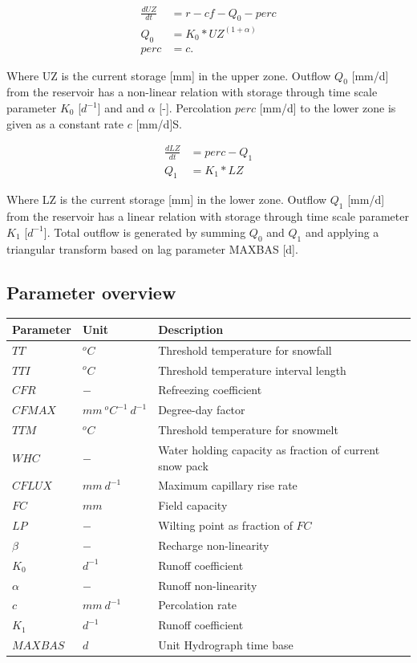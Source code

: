 \begin{align}
	\frac{dUZ}{dt} &= r-cf-Q_0-perc \\
	Q_0 &= K_0*UZ^{(1+\alpha)}\\
	perc &= c.
\end{align}

Where UZ is the current storage [mm] in the upper zone. Outflow $Q_0$ [mm/d] from the reservoir has a non-linear relation with storage through time scale parameter $K_0$ [$d^{-1}$] and and $\alpha$ [-]. Percolation $perc$ [mm/d] to the lower zone is given as a constant rate $c$ [mm/d]S.

\begin{align}
	\frac{dLZ}{dt} &= perc-Q_1 \\
	Q_1 &= K_1*LZ
\end{align}

Where LZ is the current storage [mm] in the lower zone. Outflow $Q_1$ [mm/d] from the reservoir has a linear relation with storage through time scale parameter $K_1$ [$d^{-1}$]. Total outflow is generated by summing $Q_0$ and $Q_1$ and applying a triangular transform based on lag parameter MAXBAS [d].

\subsection{Parameter overview}
\begin{table}[htbp]
  \centering
    \begin{tabular}{lll}
    \toprule
    Parameter & Unit  & Description \\
    \midrule
    $TT$  & $^oC$ & Threshold temperature for snowfall \\
    $TTI$ & $^oC$ & Threshold temperature interval length \\
    $CFR$ & $-$   & Refreezing coefficient \\
    $CFMAX$ & $mm~^oC^{-1}~d^{-1}$ & Degree-day factor \\
    $TTM$ & $^oC$ & Threshold temperature for snowmelt \\
    $WHC$ & $-$   & Water holding capacity as fraction of current snow pack \\
    $CFLUX$ & $mm~d^{-1}$ & Maximum capillary rise rate \\
    $FC$  & $mm$  & Field capacity \\
    $LP$  & $-$   & Wilting point as fraction of $FC$ \\
    $\beta$ & $-$   & Recharge non-linearity \\
    $K_0$ & $d^{-1}$ & Runoff coefficient \\
    $\alpha$ & $-$   & Runoff non-linearity \\
    $c$   & $mm~d^{-1}$ & Percolation rate \\
    $K_1$ & $d^{-1}$ & Runoff coefficient \\
    $MAXBAS$ & $d$   & Unit Hydrograph time base \\
    \bottomrule
    \end{tabular}%
  \label{tab:addlabel}%
\end{table}%

